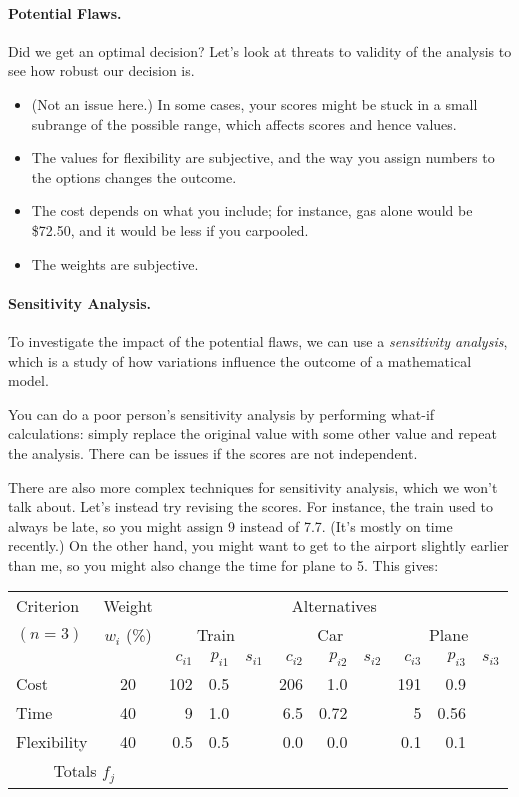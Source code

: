 \paragraph{Potential Flaws.} Did we get an optimal decision? Let's
look at threats to validity of the analysis to see how robust our decision
is.

\begin{itemize}
\item (Not an issue here.) In some cases, your scores might be stuck in a
small subrange of the possible range, which affects scores and hence values.
\item The values for flexibility are subjective, and the way you assign
numbers to the options changes the outcome.
\item The cost depends on what you include; for instance, gas alone would
be \$72.50, and it would be less if you carpooled.
\item The weights are subjective.
\end{itemize}

\paragraph{Sensitivity Analysis.} To investigate the impact of the
potential flaws, we can use a \emph{sensitivity analysis}, which is
a study of how variations influence the outcome of a mathematical model.

You can do a poor person's sensitivity analysis by performing what-if
calculations: simply replace the original value with some other value
and repeat the analysis. There can be issues if the scores are not
independent.

There are also more complex techniques for sensitivity analysis, which
we won't talk about. Let's instead try revising the scores. 
For instance, the train used to always be late, so you might assign 9
instead of 7.7. (It's mostly on time recently.) On the other hand, you
might want to get to the airport slightly earlier than me, so you might also
change the time for plane to 5. This gives:

{\Large
\begin{center}
\begin{tabular}{l|c|rrr|rrr|rrr}
Criterion & Weight & \multicolumn{9}{c}{Alternatives} \\
$(n=3)$ & $w_i$ (\%) & \multicolumn{3}{c|}{Train} & \multicolumn{3}{c|}{Car} & \multicolumn{3}{c}{Plane} \\
&& $c_{i1}$ & $p_{i1}$& $s_{i1}$ & $c_{i2}$ & $p_{i2}$ & $s_{i2}$ & $c_{i3}$ & $p_{i3}$ & $s_{i3}$ \\  \hline
Cost & 20 & 102 & 0.5 & & 206 & 1.0 & & 191 & 0.9 &  \\
Time & 40 & 9 & 1.0 & & 6.5 & 0.72 & & 5 & 0.56 \\
Flexibility & 40 & 0.5&0.5 &&0.0 &0.0 &&0.1 &0.1& \\ \hline
\multicolumn{2}{c|}{Totals $f_j$} & 
\end{tabular}
\end{center}
}

